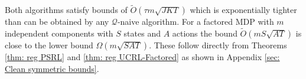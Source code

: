 \documentclass{article}
\newcommand{\Exp}{\mathds{E}}
\newcommand{\Xc}{\mathcal{X}}
\newcommand{\Qc}{\mathcal{Q}}
\newcommand{\Sc}{\mathcal{S}}
\begin{document}
Both algorithms satisfy bounds of $\tilde{O}(\tau m \sqrt{JKT})$ which is exponentially tighter than can be obtained by any $\Qc$-naive algorithm.
For a factored MDP with $m$ independent components with $S$ states and $A$ actions the bound $\tilde{O}(m S \sqrt{AT})$ is close to the lower bound $\Omega(m\sqrt{SAT})$.
These follow directly from Theorems \ref{thm: reg PSRL} and \ref{thm: reg UCRL-Factored} as shown in Appendix \ref{sec: Clean symmetric bounds}.





\end{document}
